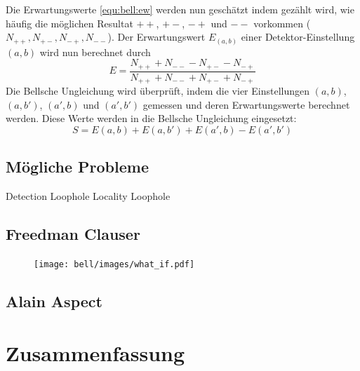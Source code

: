 \begin{refsection}
Die Erwartungswerte \eqref{equ:bell:ew} werden nun gesch\"atzt indem gez\"ahlt
wird, wie h\"aufig die m\"oglichen Resultat $++$, $+-$, $-+$ und $--$
vorkommen ($N_{++}, N_{+-}, N_{-+}, N_{--}$).
Der Erwartungswert $E_(a,b)$ einer Detektor-Einstellung $(a,b)$ wird
nun berechnet durch
\begin{equation}
    E = \frac{N_{++} + N_{--} - N_{+-} - N_{-+}}{N_{++} + N_{--} + N_{+-} + N_{-+}}
\end{equation}
Die Bellsche Ungleichung wird \"uberpr\"uft, indem die vier Einstellungen
$(a,b)$, $(a,b')$, $(a',b)$ und $(a',b')$ gemessen und deren Erwartungswerte
berechnet werden. 
Diese Werte werden in die Bellsche Ungleichung eingesetzt:
\begin{equation}
    S = E(a,b) + E(a,b') + E(a',b) - E(a',b')
\end{equation}

\subsection{M\"ogliche Probleme}

Detection Loophole
Locality Loophole

\subsection{Freedman Clauser}
    
    \begin{figure}[ht!]
        \centering
        \texttt{[image: bell/images/what\_if.pdf]}
    \end{figure}
    
\subsection{Alain Aspect}

\section{Zusammenfassung}


\printbibliography[heading=subbibliography]
\end{refsection}

